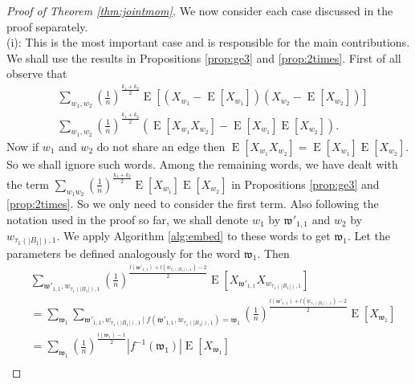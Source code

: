 \documentclass[12pt]{article}
\numberwithin{equation}{section}
\numberwithin{equation}{section}
\theoremstyle{definition}
\DeclareMathOperator{\E}{E} \DeclareMathOperator{\var}{Var}
\renewcommand{\1}{\bf 1}
\begin{document}
\begin{proof}[Proof of Theorem \ref{thm:jointmom}]
\noindent 
We now consider each case discussed in the proof separately.\\
(i): This is the most important case and is responsible for the main contributions. We shall use the results in Propositions \ref{prop:ge3} and \ref{prop:2times}. First of all observe that 
\begin{equation}
\begin{split}
&\sum_{w_{1},w_{2}}\left( \frac{1}{n} \right)^{\frac{k_{1}+k_{2}}{2}}\E\left[ \left(X_{w_{1}}-\E[X_{w_{1}}]\right)\left(X_{w_{2}}-\E[X_{w_{2}}]\right) \right]\\
& \sum_{w_{1},w_{2}} \left(\frac{1}{n}\right)^{\frac{k_{1}+k_{2}}{2}} \left(\E\left[ X_{w_{1}} X_{w_{2}} \right]- \E\left[ X_{w_{1}} \right]\E\left[ X_{w_{2}} \right]\right).
\end{split}
\end{equation}
Now if $w_{1}$ and $w_{2}$ do not share an edge then $\E[X_{w_{1}}X_{w_{2}}]=\E[X_{w_{1}}]\E[X_{w_{2}}]$. So we shall ignore such words. Among the remaining words, we have dealt with the term $\sum_{w_{1}w_{2}} \left( \frac{1}{n} \right)^{\frac{k_{1}+k_{2}}{2}} \E[X_{w_{1}}]\E[X_{w_{2}}]$ in Propositions \ref{prop:ge3} and \ref{prop:2times}. So we only need to consider the first term. Also following the notation used in the proof so far, we shall denote $w_{1}$ by $\mathfrak{w}'_{1,1}$ and $w_{2}$ by $w_{\tau_{1}(|B_{1}|),1}$. We apply Algorithm \ref{alg:embed} to these words to get $\mathfrak{w}_{1}$. Let the parameters be defined analogously for the word $\mathfrak{w}_{1}$. Then %
\begin{equation}\label{eq:joinmomcasei}
\begin{split}
&\sum_{\mathfrak{w}'_{1,1},w_{\tau_{1}(|B_{1}|),1}}\left( \frac{1}{n} \right)^{\frac{l(\mathfrak{w}'_{1,1})+ l(w_{\tau_{1}(|B_{1}|),1})-2}{2}} \E\left[ X_{\mathfrak{w}'_{1,1}}X_{w_{\tau_{1}(|B_{1}|),1}} \right]  \\     
& =\sum_{\mathfrak{w}_{1}} \sum_{\mathfrak{w}'_{1,1},w_{\tau_{1}(|B_{1}|),1}~|~ f(\mathfrak{w}'_{1,1},w_{\tau_{1}(|B_{1}|),1})= \mathfrak{w}_{1}} \left( \frac{1}{n} \right)^{\frac{l(\mathfrak{w}'_{1,1})+ l(w_{\tau_{1}(|B_{1}|),1})-2}{2}} \E\left[ X_{\mathfrak{w}_{1}} \right]\\
& = \sum_{\mathfrak{w}_{1}} \left( \frac{1}{n} \right)^{\frac{l(\mathfrak{w}_{1})-1}{2}}\left| f^{-1}(\mathfrak{w}_{1}) \right|  \E[X_{\mathfrak{w}_{1}}]\\

\end{split}
\end{equation}
\end{proof}
\end{document}
